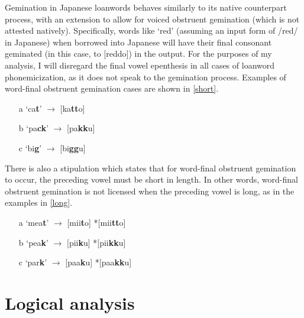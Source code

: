 \documentclass{article}
\begin{document}
Gemination in Japanese loanwords behaves similarly to its native counterpart process, with an extension to allow for voiced obstruent gemination (which is not attested natively). Specifically, words like ‘red' (assuming an input form of /red/ in Japanese) when borrowed into Japanese will have their final consonant geminated (in this case, to [reddo]) in the output. For the purposes of my analysis, I will disregard the final vowel epenthesis in all cases of loanword phonemicization, as it does not speak to the gemination process. Examples of word-final obstruent gemination cases are shown in \ref{short}. \cite{Kawahara2015}

\begin{exe}
    \ex
    \label{short}
    \begin{itemize}
        \item [a] ‘ca\textbf{t}' $\rightarrow$ [ka\textbf{tt}o]
        \item [b] ‘pa\textbf{ck}' $\rightarrow$ [pa\textbf{kk}u]
        \item [c] ‘bi\textbf{g}' $\rightarrow$ [bi\textbf{gg}u]
    \end{itemize}
\end{exe}

There is also a stipulation which states that for word-final obstruent gemination to occur, the preceding vowel must be short in length. In other words, word-final obstruent gemination is not licensed when the preceding vowel is long, as in the examples in \ref{long}. \cite{Kubozono2009}

\begin{exe}
    \ex
    \label{long}
    \begin{itemize}
        \item [a] ‘mea\textbf{t}' $\rightarrow$ [mii\textbf{t}o] \hspace{1cm} *[mii\textbf{tt}o]
        \item [b] ‘pea\textbf{k}' $\rightarrow$ [pii\textbf{k}u] \hspace{1cm} *[pii\textbf{kk}u]
        \item [c] ‘par\textbf{k}' $\rightarrow$ [paa\textbf{k}u] \hspace{1cm} *[paa\textbf{kk}u]
    \end{itemize}
\end{exe}

\section{Logical analysis}
\label{logical}
\end{document}
